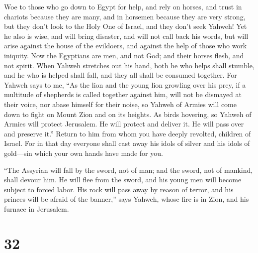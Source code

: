  Woe to those who go down to Egypt for help, and rely on
horses, and trust in chariots because they are many, and in horsemen
because they are very strong, but they don't look to the Holy One of
Israel, and they don't seek Yahweh!  Yet he also is wise,
and will bring disaster, and will not call back his words, but will
arise against the house of the evildoers, and against the help of those
who work iniquity.  Now the Egyptians are men, and not God;
and their horses flesh, and not spirit. When Yahweh stretches out his
hand, both he who helps shall stumble, and he who is helped shall fall,
and they all shall be consumed together.  For Yahweh says to
me, ``As the lion and the young lion growling over his prey, if a
multitude of shepherds is called together against him, will not be
dismayed at their voice, nor abase himself for their noise, so Yahweh of
Armies will come down to fight on Mount Zion and on its heights.
 As birds hovering, so Yahweh of Armies will protect
Jerusalem. He will protect and deliver it. He will pass over and
preserve it.''  Return to him from whom you have deeply
revolted, children of Israel.  For in that day everyone
shall cast away his idols of silver and his idols of gold---sin which
your own hands have made for you.

 ``The Assyrian will fall by the sword, not of man; and the
sword, not of mankind, shall devour him. He will flee from the sword,
and his young men will become subject to forced labor.  His
rock will pass away by reason of terror, and his princes will be afraid
of the banner,'' says Yahweh, whose fire is in Zion, and his furnace in
Jerusalem.

\hypertarget{section-31}{%
\section{32}\label{section-31}}

